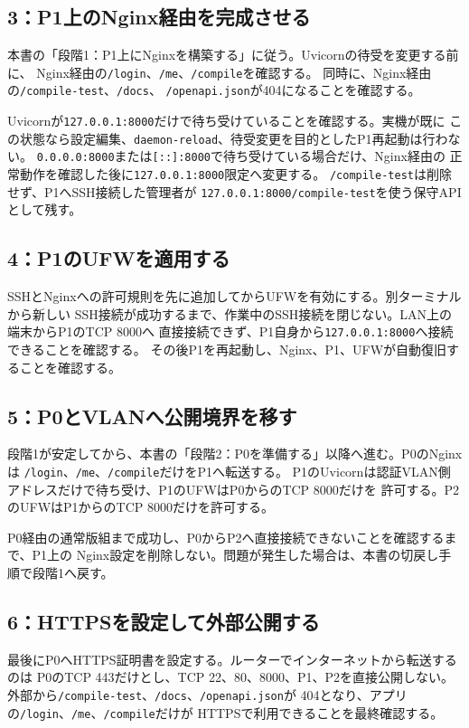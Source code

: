 \documentclass[uplatex,a4paper,11pt]{jsarticle}
\begin{document}
\subsection{3：P1上のNginx経由を完成させる}

本書の「段階1：P1上にNginxを構築する」に従う。Uvicornの待受を変更する前に、
Nginx経由の\texttt{/login}、\texttt{/me}、\texttt{/compile}を確認する。
同時に、Nginx経由の\texttt{/compile-test}、\texttt{/docs}、
\texttt{/openapi.json}が404になることを確認する。

Uvicornが\texttt{127.0.0.1:8000}だけで待ち受けていることを確認する。実機が既に
この状態なら設定編集、\texttt{daemon-reload}、待受変更を目的としたP1再起動は行わない。
\texttt{0.0.0.0:8000}または\texttt{[::]:8000}で待ち受けている場合だけ、Nginx経由の
正常動作を確認した後に\texttt{127.0.0.1:8000}限定へ変更する。
\texttt{/compile-test}は削除せず、P1へSSH接続した管理者が
\texttt{127.0.0.1:8000/compile-test}を使う保守APIとして残す。

\subsection{4：P1のUFWを適用する}

SSHとNginxへの許可規則を先に追加してからUFWを有効にする。別ターミナルから新しい
SSH接続が成功するまで、作業中のSSH接続を閉じない。LAN上の端末からP1のTCP 8000へ
直接接続できず、P1自身から\texttt{127.0.0.1:8000}へ接続できることを確認する。
その後P1を再起動し、Nginx、P1、UFWが自動復旧することを確認する。

\subsection{5：P0とVLANへ公開境界を移す}

段階1が安定してから、本書の「段階2：P0を準備する」以降へ進む。P0のNginxは
\texttt{/login}、\texttt{/me}、\texttt{/compile}だけをP1へ転送する。
P1のUvicornは認証VLAN側アドレスだけで待ち受け、P1のUFWはP0からのTCP 8000だけを
許可する。P2のUFWはP1からのTCP 8000だけを許可する。

P0経由の通常版組まで成功し、P0からP2へ直接接続できないことを確認するまで、P1上の
Nginx設定を削除しない。問題が発生した場合は、本書の切戻し手順で段階1へ戻す。

\subsection{6：HTTPSを設定して外部公開する}

最後にP0へHTTPS証明書を設定する。ルーターでインターネットから転送するのは
P0のTCP 443だけとし、TCP 22、80、8000、P1、P2を直接公開しない。
外部から\texttt{/compile-test}、\texttt{/docs}、\texttt{/openapi.json}が
404となり、アプリの\texttt{/login}、\texttt{/me}、\texttt{/compile}だけが
HTTPSで利用できることを最終確認する。
\end{document}
